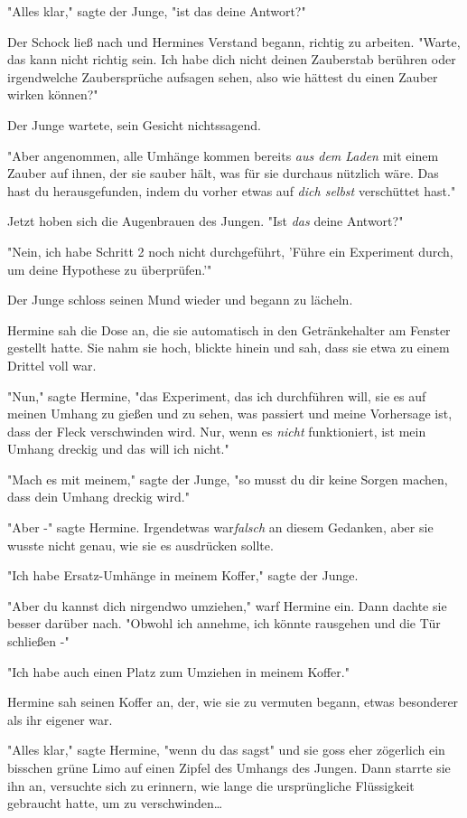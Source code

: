 {"Alles klar," sagte der Junge, "ist das deine Antwort?"

Der Schock ließ nach und Hermines Verstand begann, richtig zu arbeiten. "Warte, das kann nicht richtig sein. Ich habe dich nicht deinen Zauberstab berühren oder irgendwelche Zaubersprüche aufsagen sehen, also wie hättest du einen Zauber wirken können?"

Der Junge wartete, sein Gesicht nichtssagend.

"Aber angenommen, alle Umhänge kommen bereits \emph{aus dem Laden} mit einem Zauber auf ihnen, der sie sauber hält, was für sie durchaus nützlich wäre. Das hast du herausgefunden, indem du vorher etwas auf \emph{dich selbst} verschüttet hast."

Jetzt hoben sich die Augenbrauen des Jungen. "Ist \emph{das} deine Antwort?"

"Nein, ich habe Schritt 2 noch nicht durchgeführt, 'Führe ein Experiment durch, um deine Hypothese zu überprüfen.'"

Der Junge schloss seinen Mund wieder und begann zu lächeln.

Hermine sah die Dose an, die sie automatisch in den Getränkehalter am Fenster gestellt hatte. Sie nahm sie hoch, blickte hinein und sah, dass sie etwa zu einem Drittel voll war.

"Nun," sagte Hermine, "das Experiment, das ich durchführen will, sie es auf meinen Umhang zu gießen und zu sehen, was passiert und meine Vorhersage ist, dass der Fleck verschwinden wird. Nur, wenn es \emph{nicht} funktioniert, ist mein Umhang dreckig und das will ich nicht."

"Mach es mit meinem," sagte der Junge, "so musst du dir keine Sorgen machen, dass dein Umhang dreckig wird."

"Aber -" sagte Hermine. Irgendetwas war\emph{falsch} an diesem Gedanken, aber sie wusste nicht genau, wie sie es ausdrücken sollte.

"Ich habe Ersatz-Umhänge in meinem Koffer," sagte der Junge.

"Aber du kannst dich nirgendwo umziehen," warf Hermine ein. Dann dachte sie besser darüber nach. "Obwohl ich annehme, ich könnte rausgehen und die Tür schließen -"

"Ich habe auch einen Platz zum Umziehen in meinem Koffer."

Hermine sah seinen Koffer an, der, wie sie zu vermuten begann, etwas besonderer als ihr eigener war.

"Alles klar," sagte Hermine, "wenn du das sagst" und sie goss eher zögerlich ein bisschen grüne Limo auf einen Zipfel des Umhangs des Jungen. Dann starrte sie ihn an, versuchte sich zu erinnern, wie lange die ursprüngliche Flüssigkeit gebraucht hatte, um zu verschwinden…

}
